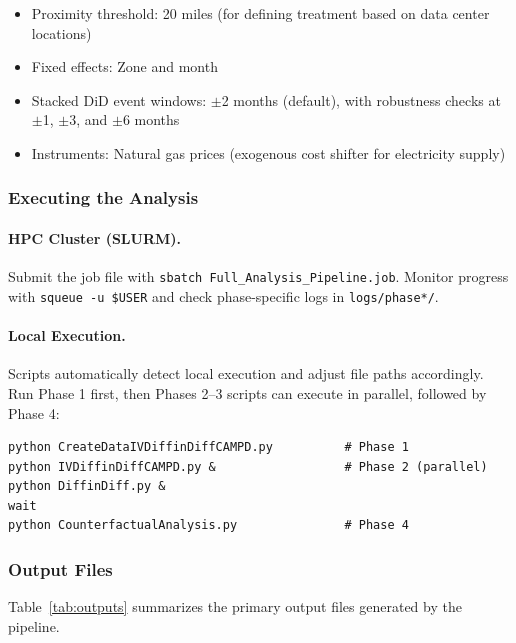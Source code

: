 \documentclass[a4paper,fleqn,longmktitle]{cas-sc}
\begin{document}
\begin{itemize}[noitemsep,topsep=0pt]
    \item Proximity threshold: 20 miles (for defining treatment based on data center locations)
    \item Fixed effects: Zone and month
    \item Stacked DiD event windows: $\pm$2 months (default), with robustness checks at $\pm$1, $\pm$3, and $\pm$6 months
    \item Instruments: Natural gas prices (exogenous cost shifter for electricity supply)
\end{itemize}

\subsubsection{Executing the Analysis}
\label{appendix:execution}

\paragraph{HPC Cluster (SLURM).} Submit the job file with \texttt{sbatch Full\_Analysis\_Pipeline.job}. Monitor progress with \texttt{squeue -u \$USER} and check phase-specific logs in \texttt{logs/phase*/}.

\paragraph{Local Execution.} Scripts automatically detect local execution and adjust file paths accordingly. Run Phase 1 first, then Phases 2--3 scripts can execute in parallel, followed by Phase 4:
\begin{verbatim}
python CreateDataIVDiffinDiffCAMPD.py          # Phase 1
python IVDiffinDiffCAMPD.py &                  # Phase 2 (parallel)
python DiffinDiff.py &
wait
python CounterfactualAnalysis.py               # Phase 4
\end{verbatim}

\subsubsection{Output Files}
\label{appendix:outputs}

Table~\ref{tab:outputs} summarizes the primary output files generated by the pipeline.
\end{document}
